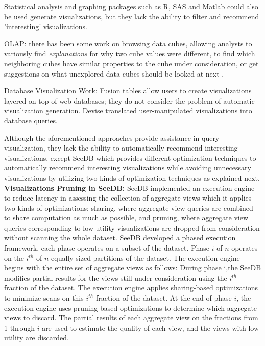 Statistical analysis and graphing packages such as R, SAS and Matlab could also be used generate visualizations, but they lack the ability to filter and recommend 'interesting' visualizations.
%

OLAP: there has been some work on browsing data cubes, allowing analysts to variously find \emph{explanations} for why two cube values were different, to find which neighboring cubes have similar properties to the cube under consideration, or get suggestions on what unexplored data cubes should be looked at next \cite{DBLP:journals/dr/Jagadish99b,DBLP:conf/vldb/Sarawagi00,DBLP:conf/vldb/SatheS01}.
%

Database Visualization Work: Fusion tables \cite{DBLP:conf/sigmod/GonzalezHJLMSSG10} allow users to create visualizations layered on top of web databases; they do not consider the problem of automatic visualization generation. Devise \cite{DBLP:conf/sigmod/HellersteinHW97} translated user-manipulated visualizations into database queries.
%

Although the aforementioned approaches provide assistance in query visualization, they lack the ability to automatically recommend interesting visualizations, except SeeDB which provides different optimization techniques to automatically recommend interesting visualizations while avoiding unnecessary visualizations by utilizing two kinds of optimization techniques as explained next.\\
%

\noindent \textbf{Visualizations Pruning in SeeDB:}
SeeDB implemented an execution engine to reduce latency in assessing the collection of 
aggregate views which it applies two kinds of optimizations: sharing, 
where aggregate view queries are combined to share computation as much as possible, 
and pruning, where aggregate view queries corresponding to low utility visualizations 
are dropped from consideration without scanning the whole dataset. 
SeeDB developed a phased execution framework, each phase operates on a subset of the dataset. 
Phase $i$ of $n$ operates on the $i^{th}$ of $n$ equally-sized partitions of the dataset. 
The execution engine begins with the entire set of aggregate views as follows:
During phase i,the SeeDB \cite{DBLP:journals/pvldb/VartakMPP14} modifies partial results for the views still under consideration 
using the $i^{th}$ fraction of the dataset. 
The execution engine applies sharing-based optimizations to minimize scans on this $i^{th}$ fraction 
of the dataset.
At the end of phase $i$, the execution engine uses pruning-based optimizations to determine which aggregate views to discard. The partial results of each aggregate view on the fractions from 1 through $i$ are used to estimate the quality of each view, and the views with low utility are discarded.

